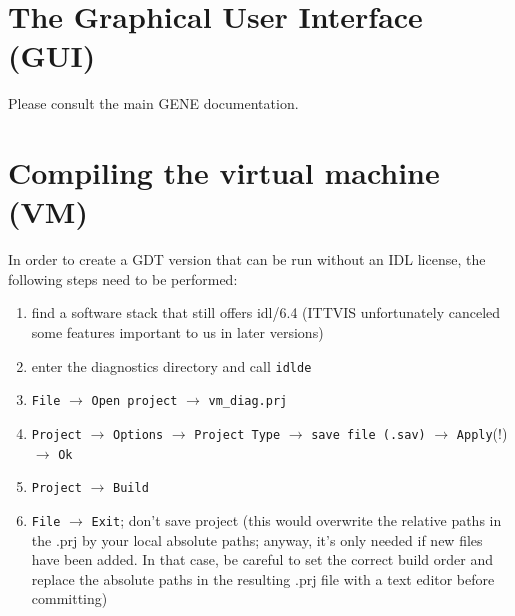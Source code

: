\documentclass[12pt]{article}
\begin{document}
\section{The Graphical User Interface (GUI)}
Please consult the main {\sc GENE} documentation.

\newpage
\appendix
\section{Compiling the virtual machine (VM)}
In order to create a GDT version that can be run without an IDL license, the following steps need to be performed:

\begin{enumerate}

\item find a software stack that still offers idl/6.4  (ITTVIS unfortunately canceled some features important to us in later versions)

\item enter the diagnostics directory and call {\tt idlde}

\item {\tt File} $\rightarrow$ {\tt Open project} $\rightarrow$ {\tt vm\_diag.prj}

\item {\tt Project} $\rightarrow$ {\tt Options} $\rightarrow$ {\tt Project Type} $\rightarrow$ {\tt save file (.sav)} $\rightarrow$ {\tt Apply}(!) $\rightarrow$ {\tt Ok}

\item {\tt Project} $\rightarrow$ {\tt Build}

\item {\tt File} $\rightarrow$ {\tt Exit}; don't save project (this would overwrite the relative paths in the .prj by your local absolute paths; anyway, it's only needed if new files have been added. In that case, be careful to set the correct build order and replace the absolute paths in the resulting .prj file with a text editor before committing)
\end{enumerate}
\end{document}
